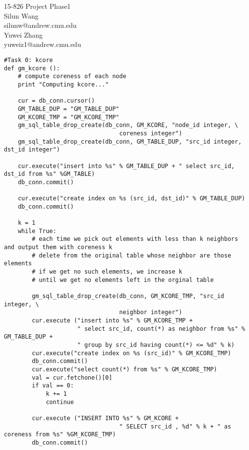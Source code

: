 \documentclass[11pt]{article}
\makeatletter
\newcommand{\name}{Silun Wang}
\newcommand{\andrew}{silunw@andrew.cmu.edu}
\newcommand{\myname}{Yuwei Zhang}
\newcommand{\myandrew}{yuweiz1@andrew.cmu.edu}
\newcommand{\myhwnum}{1}
\makeatother
\begin{document}
\medskip                        %

\thispagestyle{plain}
\begin{center}                  %
{\Large 15-826 Project Phase\myhwnum} \\[10pt]
\name \\
\andrew \\
\myname \\
\myandrew \\

\end{center}
\begin{lstlisting}
#Task 0: kcore
def gm_kcore ():
    # compute coreness of each node
    print "Computing kcore..."
    
    cur = db_conn.cursor()
    GM_TABLE_DUP = "GM_TABLE_DUP"
    GM_KCORE_TMP = "GM_KCORE_TMP"
    gm_sql_table_drop_create(db_conn, GM_KCORE, "node_id integer, \
                                 coreness integer")
    gm_sql_table_drop_create(db_conn, GM_TABLE_DUP, "src_id integer, dst_id integer")

    cur.execute("insert into %s" % GM_TABLE_DUP + " select src_id, dst_id from %s" %GM_TABLE)
    db_conn.commit()

    cur.execute("create index on %s (src_id, dst_id)" % GM_TABLE_DUP)
    db_conn.commit()

    k = 1
    while True:
        # each time we pick out elements with less than k neighbors and output them with coreness k
        # delete from the original table whose neighbor are those elements
        # if we get no such elements, we increase k
        # until we get no elements left in the orginal table

        gm_sql_table_drop_create(db_conn, GM_KCORE_TMP, "src_id integer, \
                                 neighbor integer")
        cur.execute ("insert into %s" % GM_KCORE_TMP + 
                     " select src_id, count(*) as neighbor from %s" % GM_TABLE_DUP +
                     " group by src_id having count(*) <= %d" % k)
        cur.execute("create index on %s (src_id)" % GM_KCORE_TMP)
        db_conn.commit()
        cur.execute("select count(*) from %s" % GM_KCORE_TMP)
        val = cur.fetchone()[0]
        if val == 0:
            k += 1
            continue

        cur.execute ("INSERT INTO %s" % GM_KCORE +
                                 " SELECT src_id , %d" % k + " as coreness from %s" %GM_KCORE_TMP)
        db_conn.commit()


\end{lstlisting}
\end{document}
